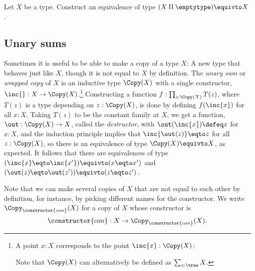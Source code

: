 \begin{xca}
  Let $X$ be a type.  Construct an equivalence of type $(X \amalg \emptytype) \equivto X$.
\end{xca}

\subsection{Unary sums}\label{sec:unary-sum-types}

Sometimes it is useful to be able to make a copy of a type $X$:
A new type that behaves just like $X$,
though it is not equal to $X$ by definition.
The \emph{unary sum} or \emph{wrapped copy} of $X$ is an inductive type $\Copy(X)$
with a single constructor, $\inc{} : X \to \Copy(X)$.\footnote{%
  A point $x:X$ corresponds to the point $\inc{x}:\Copy(X)$:\par
  \par
  \noindent Note that $\Copy(X)$ can alternatively be defined as $\sum_{z:\true}X$.}
Constructing a function $f : \prod_{z:\Copy(X)}T(z)$,
where $T(z)$ is a type depending on $z : \Copy(X)$,
is done by defining $f(\inc{x})$ for all $x:X$.
Taking $T(z)$ to be the constant family at $X$,
we get a function, $\out : \Copy(X) \to X$,
called the \emph{destructor},
with $\out(\inc{x}) \defeq x$ for $x:X$,
and the induction principle implies that $\inc{\out(z)} \eqto z$
for all $z:\Copy(X)$, so there is an equivalence of type
$\Copy(X) \equivto X$, as expected.
It follows that there are equivalences of type
$(\inc{x} \eqto \inc{x'}) \equivto (x \eqto x')$ and
$(\out(z) \eqto \out(z')) \equivto (z \eqto z')$.

Note that we can make several copies of $X$ that are not
equal to each other by definition,
for instance, by picking different names for the constructor.
We write $\Copy_{\constructor{con}}(X)$ for a copy of $X$
whose constructor is
\[
  \constructor{con} : X \to \Copy_{\constructor{con}}(X).
\]

